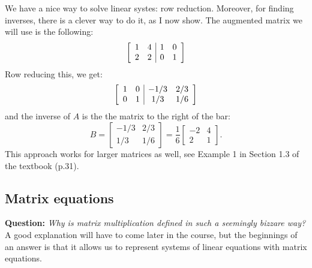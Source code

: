 \documentclass[10pt]{article}
\newenvironment{augmentedmatrix}[1] %
{\left[\begin{array}{#1}}
    {\end{array}\right]}
\theoremstyle{definition}
\begin{document}
We have a nice way to solve linear systes: row reduction. Moreover, for
finding inverses, there is a clever way to do it, as I now show. The augmented
matrix we will use is the following:
\begin{equation*}
  \begin{augmentedmatrix}{cc|cc}
    1&4&1&0\\
    2&2&0&1
  \end{augmentedmatrix}
\end{equation*}
Row reducing this, we get:
\begin{equation*}
  \begin{augmentedmatrix}{cc|cc}
    1&0&-1/3&2/3\\
    0&1&1/3&1/6
  \end{augmentedmatrix}
\end{equation*}
and the inverse of $A$ is the the matrix to the right of the bar:
\begin{equation*}
  B =
  \begin{bmatrix}
    -1/3&2/3\\
    1/3&1/6
  \end{bmatrix}
  = \frac{1}{6}
  \begin{bmatrix}
    -2&4\\
    2&1
  \end{bmatrix}.
\end{equation*}
This approach works for larger matrices as well, see Example 1 in Section 1.3
of the textbook (p.31).

\subsection{Matrix equations}
\textbf{Question:} \textit{Why is matrix multiplication defined in such a
  seemingly bizzare way?} A good explanation will have to come later in the
course, but the beginnings of an answer is that it allows us to represent
systems of linear equations with matrix equations.
\end{document}
